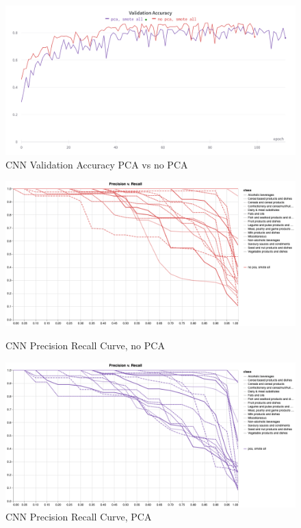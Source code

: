 \documentclass[12pt,a4paper]{article}
\begin{document}
    \begin{figure}[h]
        \centering
        \includegraphics[height=0.3\textheight]{smote-all-val-acc}
        \caption{CNN Validation Accuracy PCA vs no PCA}
        \label{fig:cnn-val-acc}
    \end{figure}

    \begin{figure}[h]
        \centering

        \begin{minipage}{0.48\textwidth}
            \centering
            \includegraphics[width=\textwidth]{cnn-nopca-prec} %
            \caption{CNN Precision Recall Curve, no PCA}
            \label{fig:cnn-nopca-prec}
        \end{minipage}\hfill

        \begin{minipage}{0.48\textwidth}
            \centering
            \includegraphics[width=\textwidth]{cnn-pca-prec} %
            \caption{CNN Precision Recall Curve, PCA}
            \label{fig:cnn-pca-prec}
        \end{minipage}

    \end{figure}
\end{document}
